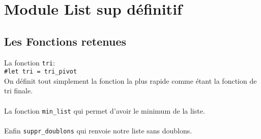 \documentclass[a4paper, 11pt]{article}
\begin{document}
\section{Module List sup définitif}
\subsection{Les Fonctions retenues}
La fonction \texttt{tri}:\\
\texttt{\#let tri = tri\_pivot} \\
On définit tout simplement la fonction la plus rapide comme étant la fonction de tri finale.\\ \\
La fonction \texttt{min\_list} qui permet d'avoir le minimum de la liste. \\ \\
Enfin \texttt{suppr\_doublons} qui renvoie notre liste sans doublons.
\end{document}
